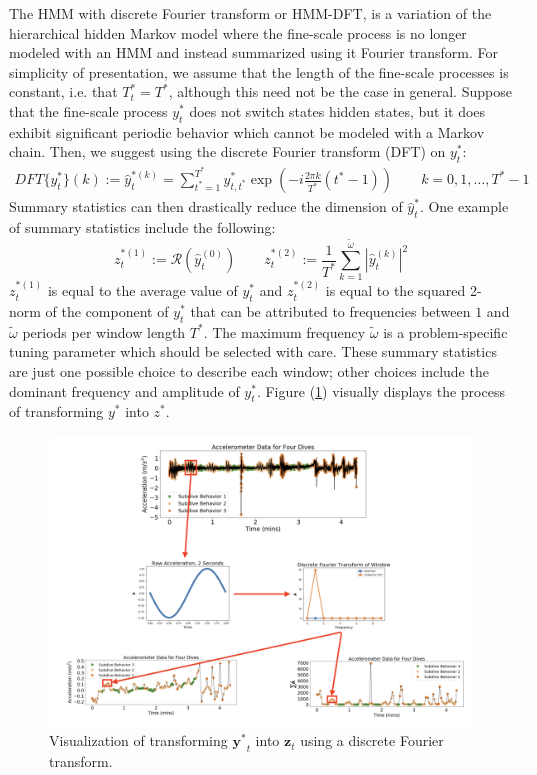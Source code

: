 The HMM with discrete Fourier transform or HMM-DFT, is a variation of the hierarchical hidden Markov model where the fine-scale process is no longer modeled with an HMM and instead summarized using it Fourier transform. For simplicity of presentation, we assume that the length of the fine-scale processes is constant, i.e. that $T^*_t = T^*$, although this need not be the case in general. Suppose that the fine-scale process $y^*_t$ does not switch states hidden states, but it does exhibit significant periodic behavior which cannot be modeled with a Markov chain. Then, we suggest using the discrete Fourier transform (DFT) on $y^*_t$:
%
\begin{align*}
    DFT\{y^*_t\}(k) := \hat{y}^{*(k)}_{t} = \sum_{t^* = 1}^{T^*} y^*_{t,t^*}\exp\left(-i \frac{2\pi k}{T^*} (t^*-1)\right) \qquad k = 0, 1, \ldots, T^*-1
\end{align*}
%
Summary statistics can then drastically reduce the dimension of $\hat{y}^*_t$. One example of summary statistics include the following:
%
\begin{equation}
    \label{eqn:z}
    z_t^{*(1)} := \mathcal{R}\left(\hat{y}^{(0)}_t\right) \qquad z_t^{*(2)} := \frac{1}{T^*}\sum_{k=1}^{\tilde{\omega}}|\hat{y}^{(k)}_t|^2
\end{equation}
%
$z_t^{*(1)}$ is equal to the average value of $y^*_t$ and $z_t^{*(2)}$ is equal to the squared 2-norm of the component of $y^*_t$ that can be attributed to frequencies between $1$ and $\tilde{\omega}$ periods per window length $T^*$. The maximum frequency $\tilde{\omega}$ is a problem-specific tuning parameter which should be selected with care. These summary statistics are just one possible choice to describe each window; other choices include the dominant frequency and amplitude of $y^*_t$. Figure (\ref{fig:fourier_example}) visually displays the process of transforming $y^*$ into $z^*$.

\begin{figure}[t]
	\centering
	\includegraphics[width=5in]{../Plots/fourier_transform.png}
	\caption{Visualization of transforming $\mathbf{y^*}_t$ into $\mathbf{z}_t$ using a discrete Fourier transform.}
	\label{fig:fourier_example}
\end{figure}

